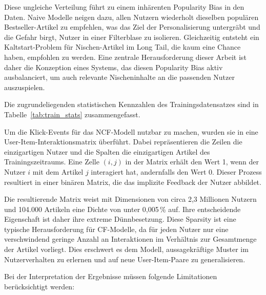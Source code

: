 Diese ungleiche Verteilung führt zu einem inhärenten Popularity Bias in den Daten. 
Naive Modelle neigen dazu, allen Nutzern wiederholt dieselben populären Bestseller-Artikel zu empfehlen, 
was das Ziel der Personalisierung untergräbt und die Gefahr birgt, Nutzer in einer Filterblase zu isolieren. 
Gleichzeitig entsteht ein Kaltstart-Problem für Nischen-Artikel im Long Tail, die kaum eine Chance haben, empfohlen zu werden. 
Eine zentrale Herausforderung dieser Arbeit ist daher die Konzeption eines Systems, 
das diesen Popularity Bias aktiv ausbalanciert, um auch relevante Nischeninhalte an die passenden Nutzer auszuspielen.



Die zugrundeliegenden statistischen Kennzahlen des Trainingsdatensatzes sind in Tabelle~\ref{tab:train_stats} zusammengefasst.


\label{tab:train_stats}

Um die Klick-Events für das \ac{NCF}-Modell nutzbar zu machen, wurden sie in eine User-Item-Interaktionsmatrix überführt. 
Dabei repräsentieren die Zeilen die einzigartigen Nutzer und die Spalten die einzigartigen Artikel des Trainingszeitraums. 
Eine Zelle $(i, j)$ in der Matrix erhält den Wert 1, wenn der Nutzer $i$ mit dem Artikel $j$ interagiert hat, andernfalls den Wert 0. 
Dieser Prozess resultiert in einer binären Matrix, die das implizite Feedback der Nutzer abbildet.

\newpage
Die resultierende Matrix weist mit Dimensionen von circa 2,3 Millionen Nutzern und 104.000 Artikeln eine Dichte von unter 0,005\,\% auf. 
Ihre entscheidende Eigenschaft ist daher ihre extreme Dünnbesetzung. 
Diese Sparsity ist eine typische Herausforderung für \ac{CF}-Modelle, da für jeden Nutzer nur eine verschwindend geringe Anzahl an Interaktionen im Verhältnis zur Gesamtmenge der Artikel vorliegt. 
Dies erschwert es dem Modell, aussagekräftige Muster im Nutzerverhalten zu erlernen und auf neue User-Item-Paare zu generalisieren.

Bei der Interpretation der Ergebnisse müssen folgende Limitationen berücksichtigt werden:

